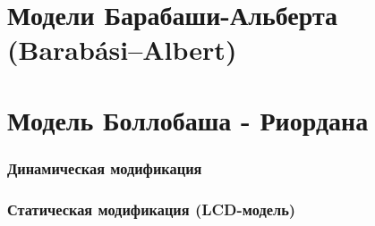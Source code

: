 \documentclass[t]{beamer}
\begin{document}
    \section{Модели Барабаши-Альберта (Barabási–Albert)} 
        \subsection{}

        \begin{frame}
            
        \end{frame}	

        \begin{frame}
            
        \end{frame}	

        \begin{frame}
            
        \end{frame}	
        
        \begin{frame}
            
        \end{frame}	

        \begin{frame}
            
        \end{frame}	

    \section{Модель Боллобаша - Риордана}
        \subsubsection{}

        \begin{frame}
            
        \end{frame}	
    
        \subsubsection{Динамическая модификация}
                
        \subsubsection{Статическая модификация (LCD-модель)}
\end{document}
